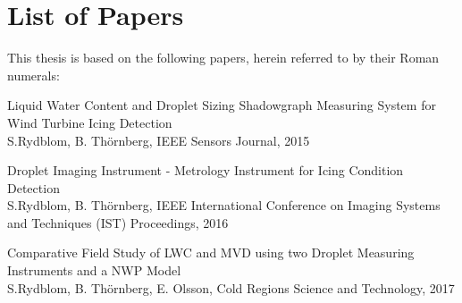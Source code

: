 

\thispagestyle{plain}

\chapter*{List of Papers}
\vspace{20pt}

\noindent This thesis is based on the following papers, herein referred to by their Roman numerals:  

\newcommand{\paperone}{Liquid Water Content and Droplet Sizing Shadowgraph Measuring System for Wind Turbine Icing Detection}
\newcommand{\papertwo}{Droplet Imaging Instrument - Metrology Instrument for Icing Condition Detection}
\newcommand{\paperthree}{Comparative Field Study of LWC and MVD using two Droplet Measuring Instruments and a NWP Model}

\newcommand{\authorone}{S.Rydblom, B. Thörnberg}
\newcommand{\authortwo}{S.Rydblom, B. Thörnberg, E. Olsson}


\newcommand{\ieeesens}{IEEE Sensors Journal}
\newcommand{\ieeeconf}{IEEE International Conference on Imaging Systems and Techniques (IST) Proceedings}
\newcommand{\mst}{Measurement Science and Technology}
\newcommand{\coldreg}{Cold Regions Science and Technology}

\begin{description}[style=nextline]
    \item[Paper I]
    \paperone \\ 
    \authorone, \ieeesens, 2015\dotfill \pageref{pap:paper1}
    
    \item[Paper II]
    \papertwo \\ 
    \authorone, \ieeeconf, 2016\dotfill \pageref{pap:paper2}
     
    \item[Paper III]
    \paperthree \\ 
    \authortwo, \coldreg, 2017\dotfill \pageref{pap:paper3}

%    
%   
%



\end{description}

